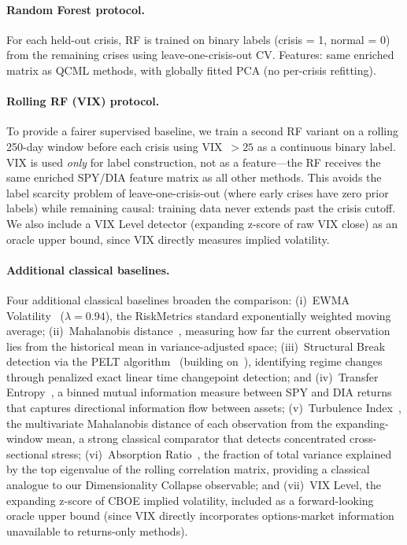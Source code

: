 \documentclass[3p]{elsarticle}
\begin{document}
\paragraph{Random Forest protocol.}
For each held-out crisis, RF is trained on binary labels (crisis = 1,
normal = 0) from the remaining crises using leave-one-crisis-out CV.
Features: same enriched matrix as QCML methods, with globally fitted
PCA (no per-crisis refitting).

\paragraph{Rolling RF (VIX) protocol.}
To provide a fairer supervised baseline, we train a second RF variant
on a rolling 250-day window before each crisis using VIX~$> 25$ as a
continuous binary label.  VIX is used \emph{only} for label construction,
not as a feature---the RF receives the same enriched SPY/DIA feature
matrix as all other methods.  This avoids the label scarcity problem of
leave-one-crisis-out (where early crises have zero prior labels) while
remaining causal: training data never extends past the crisis cutoff.
We also include a VIX Level detector (expanding z-score of raw VIX
close) as an oracle upper bound, since VIX directly measures implied
volatility.

\paragraph{Additional classical baselines.}
Four additional classical baselines broaden the comparison:
(i)~EWMA Volatility~\cite{jpmorgan1996} ($\lambda = 0.94$), the
RiskMetrics standard exponentially weighted moving average;
(ii)~Mahalanobis distance~\cite{mahalanobis1936}, measuring how far
the current observation lies from the historical mean in
variance-adjusted space;
(iii)~Structural Break detection via the PELT
algorithm~\cite{killick2012} (building on~\cite{bai1998}), identifying
regime changes through penalized exact linear time changepoint detection; and
(iv)~Transfer Entropy~\cite{schreiber2000}, a binned mutual
information measure between SPY and DIA returns that captures
directional information flow between assets;
(v)~Turbulence Index~\cite{chow1999}, the multivariate Mahalanobis
distance of each observation from the expanding-window mean, a strong
classical comparator that detects concentrated cross-sectional stress;
(vi)~Absorption Ratio~\cite{kritzman2011}, the fraction of total
variance explained by the top eigenvalue of the rolling correlation
matrix, providing a classical analogue to our Dimensionality Collapse
observable; and
(vii)~VIX Level, the expanding z-score of CBOE implied volatility,
included as a forward-looking oracle upper bound (since VIX directly
incorporates options-market information unavailable to returns-only methods).
\end{document}
